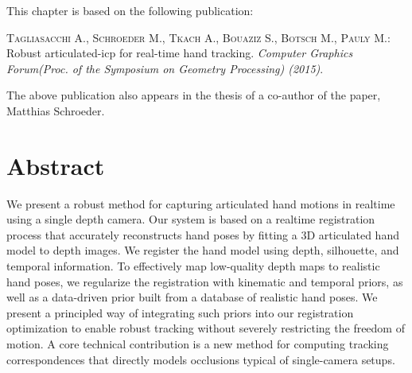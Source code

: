 
This chapter is based on the following publication:

\begin{adjustwidth}{2.5em}{0pt}
\textsc{Tagliasacchi A., Schroeder M., Tkach A., Bouaziz S., Botsch M., Pauly
M.}: Robust articulated-icp for real-time hand tracking. \textit{Computer Graphics
Forum(Proc. of the Symposium on Geometry Processing) (2015)}.
\end{adjustwidth}

The above publication also appears in the thesis of a co-author of the paper, Matthias Schroeder.

\section*{Abstract}
We present a robust method for capturing articulated hand motions in realtime using a single depth camera. Our system is based on a realtime registration process that accurately reconstructs hand poses by fitting a 3D articulated hand model to depth images.
We register the hand model using depth, silhouette, and temporal information. To effectively map low-quality depth maps to realistic hand poses, we regularize the registration with kinematic and temporal priors, as well as a data-driven prior built from a database of realistic hand poses.
We present a principled way of integrating such priors into our registration optimization to enable robust tracking without severely restricting the freedom of motion.
A core technical contribution is a new method for computing tracking correspondences that directly models occlusions typical of single-camera setups.





